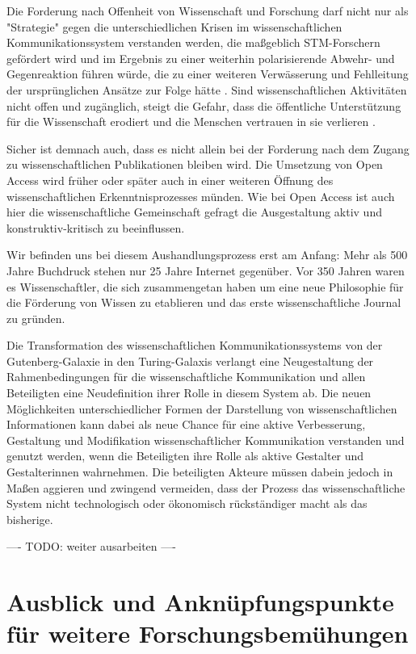 Die Forderung nach Offenheit von Wissenschaft und Forschung darf nicht nur als "Strategie" gegen die unterschiedlichen Krisen im wissenschaftlichen Kommunikationssystem verstanden werden, die maßgeblich STM-Forschern gefördert wird und im Ergebnis zu einer weiterhin polarisierende Abwehr- und Gegenreaktion führen würde, die zu einer weiteren Verwässerung und Fehlleitung der ursprünglichen Ansätze zur Folge hätte \cite{naeder_2010_open}. Sind wissenschaftlichen Aktivitäten nicht offen und zugänglich, steigt die Gefahr, dass die öffentliche Unterstützung für die Wissenschaft erodiert und die Menschen vertrauen in sie verlieren \cite{resnik_2005_ethics}.

Sicher ist demnach auch, dass es nicht allein bei der Forderung nach dem Zugang zu wissenschaftlichen Publikationen bleiben wird. Die Umsetzung von Open Access wird früher oder später auch in einer weiteren Öffnung des wissenschaftlichen Erkenntnisprozesses münden. Wie bei Open Access ist auch hier die wissenschaftliche Gemeinschaft gefragt die Ausgestaltung aktiv und konstruktiv-kritisch zu beeinflussen.

Wir befinden uns bei diesem Aushandlungsprozess erst am Anfang: Mehr als 500 Jahre Buchdruck stehen nur 25 Jahre Internet gegenüber. Vor 350 Jahren waren es Wissenschaftler, die sich zusammengetan haben um eine neue Philosophie für die Förderung von Wissen zu etablieren und das erste wissenschaftliche Journal zu gründen.

Die Transformation des wissenschaftlichen Kommunikationssystems von der Gutenberg-Galaxie in den Turing-Galaxis verlangt eine Neugestaltung der Rahmenbedingungen für die wissenschaftliche Kommunikation und allen Beteiligten eine Neudefinition ihrer Rolle in diesem System ab. Die neuen Möglichkeiten unterschiedlicher Formen der Darstellung von wissenschaftlichen Informationen kann dabei als neue Chance für eine aktive Verbesserung, Gestaltung und Modifikation wissenschaftlicher Kommunikation verstanden und genutzt werden, wenn die Beteiligten ihre Rolle als aktive Gestalter und Gestalterinnen wahrnehmen. Die beteiligten Akteure müssen dabein jedoch in Maßen aggieren und zwingend vermeiden, dass der Prozess das wissenschaftliche System nicht technologisch oder ökonomisch rückständiger macht als das bisherige.

---- TODO: weiter ausarbeiten ----

\section{Ausblick und Anknüpfungspunkte für weitere Forschungsbemühungen}

